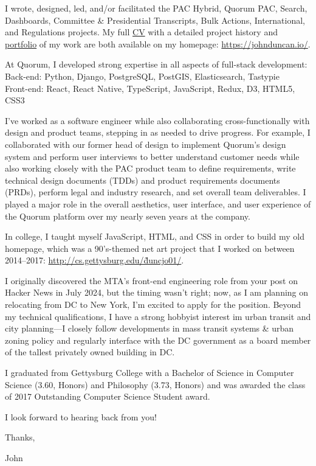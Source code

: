 \documentclass[]{article}
\begin{document}
I wrote, designed, led, and/or facilitated the PAC Hybrid, Quorum PAC, Search, Dashboards, Committee \& Presidential Transcripts, Bulk Actions, International, and Regulations projects. My full \href{https://johnduncan.io/cv.pdf}{CV} with a detailed project history and \href{https://johnduncan.io/portfolio#quorum}{portfolio} of my work are both available on my homepage: \href{https://johnduncan.io/}{https://johnduncan.io/}.

At Quorum, I developed strong expertise in all aspects of full-stack development:\\
Back-end: Python, Django, PostgreSQL, PostGIS, Elasticsearch, Tastypie\\
Front-end: React, React Native, TypeScript, JavaScript, Redux, D3, HTML5, CSS3

I’ve worked as a software engineer while also collaborating cross-functionally with design and product teams, stepping in as needed to drive progress. For example, I collaborated with our former head of design to implement Quorum's design system and perform user interviews to better understand customer needs while also working closely with the PAC product team to define requirements, write technical design documents (TDDs) and product requirements documents (PRDs), perform legal and industry research, and set overall team deliverables. I played a major role in the overall aesthetics, user interface, and user experience of the Quorum platform over my nearly seven years at the company.

In college, I taught myself JavaScript, HTML, and CSS in order to build my old homepage, which was a 90’s-themed net art project that I worked on between 2014--2017: \href{http://cs.gettysburg.edu/~duncjo01/}{http://cs.gettysburg.edu/\~duncjo01/}.

I originally discovered the MTA's front-end engineering role from your post on Hacker News in July 2024, but the timing wasn't right; now, as I am planning on relocating from DC to New York, I'm excited to apply for the position. Beyond my technical qualifications, I have a strong hobbyist interest im urban transit and city planning—I closely follow developments in mass transit systems \& urban zoning policy and regularly interface with the DC government as a board member of the tallest privately owned building in DC.

I graduated from Gettysburg College with a Bachelor of Science in Computer Science (3.60, Honors) and Philosophy (3.73, Honors) and was awarded the class of 2017 Outstanding Computer Science Student award.

I look forward to hearing back from you!

Thanks,

John
\end{document}
